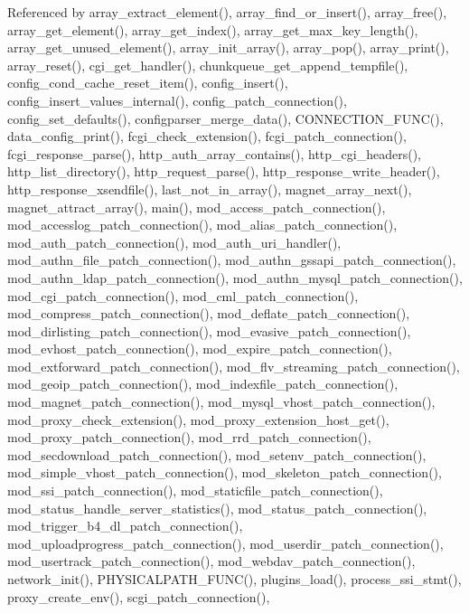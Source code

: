Referenced by array\-\_\-extract\-\_\-element(), array\-\_\-find\-\_\-or\-\_\-insert(), array\-\_\-free(), array\-\_\-get\-\_\-element(), array\-\_\-get\-\_\-index(), array\-\_\-get\-\_\-max\-\_\-key\-\_\-length(), array\-\_\-get\-\_\-unused\-\_\-element(), array\-\_\-init\-\_\-array(), array\-\_\-pop(), array\-\_\-print(), array\-\_\-reset(), cgi\-\_\-get\-\_\-handler(), chunkqueue\-\_\-get\-\_\-append\-\_\-tempfile(), config\-\_\-cond\-\_\-cache\-\_\-reset\-\_\-item(), config\-\_\-insert(), config\-\_\-insert\-\_\-values\-\_\-internal(), config\-\_\-patch\-\_\-connection(), config\-\_\-set\-\_\-defaults(), configparser\-\_\-merge\-\_\-data(), C\-O\-N\-N\-E\-C\-T\-I\-O\-N\-\_\-\-F\-U\-N\-C(), data\-\_\-config\-\_\-print(), fcgi\-\_\-check\-\_\-extension(), fcgi\-\_\-patch\-\_\-connection(), fcgi\-\_\-response\-\_\-parse(), http\-\_\-auth\-\_\-array\-\_\-contains(), http\-\_\-cgi\-\_\-headers(), http\-\_\-list\-\_\-directory(), http\-\_\-request\-\_\-parse(), http\-\_\-response\-\_\-write\-\_\-header(), http\-\_\-response\-\_\-xsendfile(), last\-\_\-not\-\_\-in\-\_\-array(), magnet\-\_\-array\-\_\-next(), magnet\-\_\-attract\-\_\-array(), main(), mod\-\_\-access\-\_\-patch\-\_\-connection(), mod\-\_\-accesslog\-\_\-patch\-\_\-connection(), mod\-\_\-alias\-\_\-patch\-\_\-connection(), mod\-\_\-auth\-\_\-patch\-\_\-connection(), mod\-\_\-auth\-\_\-uri\-\_\-handler(), mod\-\_\-authn\-\_\-file\-\_\-patch\-\_\-connection(), mod\-\_\-authn\-\_\-gssapi\-\_\-patch\-\_\-connection(), mod\-\_\-authn\-\_\-ldap\-\_\-patch\-\_\-connection(), mod\-\_\-authn\-\_\-mysql\-\_\-patch\-\_\-connection(), mod\-\_\-cgi\-\_\-patch\-\_\-connection(), mod\-\_\-cml\-\_\-patch\-\_\-connection(), mod\-\_\-compress\-\_\-patch\-\_\-connection(), mod\-\_\-deflate\-\_\-patch\-\_\-connection(), mod\-\_\-dirlisting\-\_\-patch\-\_\-connection(), mod\-\_\-evasive\-\_\-patch\-\_\-connection(), mod\-\_\-evhost\-\_\-patch\-\_\-connection(), mod\-\_\-expire\-\_\-patch\-\_\-connection(), mod\-\_\-extforward\-\_\-patch\-\_\-connection(), mod\-\_\-flv\-\_\-streaming\-\_\-patch\-\_\-connection(), mod\-\_\-geoip\-\_\-patch\-\_\-connection(), mod\-\_\-indexfile\-\_\-patch\-\_\-connection(), mod\-\_\-magnet\-\_\-patch\-\_\-connection(), mod\-\_\-mysql\-\_\-vhost\-\_\-patch\-\_\-connection(), mod\-\_\-proxy\-\_\-check\-\_\-extension(), mod\-\_\-proxy\-\_\-extension\-\_\-host\-\_\-get(), mod\-\_\-proxy\-\_\-patch\-\_\-connection(), mod\-\_\-rrd\-\_\-patch\-\_\-connection(), mod\-\_\-secdownload\-\_\-patch\-\_\-connection(), mod\-\_\-setenv\-\_\-patch\-\_\-connection(), mod\-\_\-simple\-\_\-vhost\-\_\-patch\-\_\-connection(), mod\-\_\-skeleton\-\_\-patch\-\_\-connection(), mod\-\_\-ssi\-\_\-patch\-\_\-connection(), mod\-\_\-staticfile\-\_\-patch\-\_\-connection(), mod\-\_\-status\-\_\-handle\-\_\-server\-\_\-statistics(), mod\-\_\-status\-\_\-patch\-\_\-connection(), mod\-\_\-trigger\-\_\-b4\-\_\-dl\-\_\-patch\-\_\-connection(), mod\-\_\-uploadprogress\-\_\-patch\-\_\-connection(), mod\-\_\-userdir\-\_\-patch\-\_\-connection(), mod\-\_\-usertrack\-\_\-patch\-\_\-connection(), mod\-\_\-webdav\-\_\-patch\-\_\-connection(), network\-\_\-init(), P\-H\-Y\-S\-I\-C\-A\-L\-P\-A\-T\-H\-\_\-\-F\-U\-N\-C(), plugins\-\_\-load(), process\-\_\-ssi\-\_\-stmt(), proxy\-\_\-create\-\_\-env(), scgi\-\_\-patch\-\_\-connection(), 